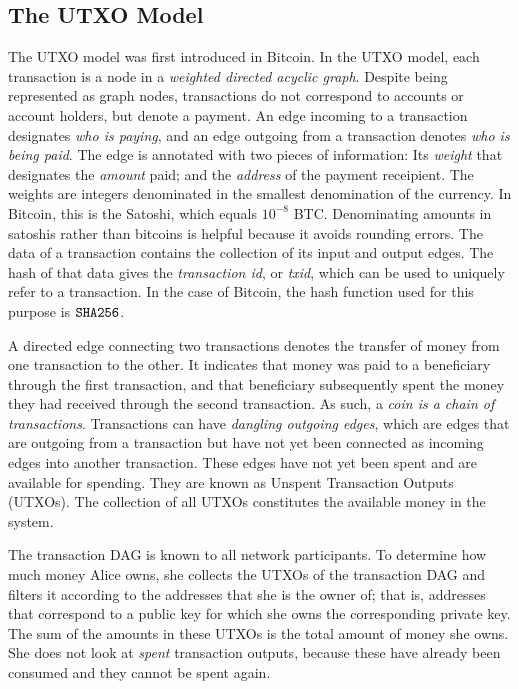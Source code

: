 \subsection{The UTXO Model}

The UTXO model was first introduced in Bitcoin. In the UTXO model, each
transaction is a node in a \emph{weighted directed acyclic graph}. Despite being
represented as graph nodes, transactions do not correspond to accounts or
account holders, but denote a payment. An edge incoming to a transaction
designates \emph{who is paying}, and an edge outgoing from a transaction denotes
\emph{who is being paid}. The edge is annotated with two pieces of information:
Its \emph{weight} that designates the \emph{amount} paid; and the \emph{address}
of the payment receipient. The weights are integers denominated in the smallest
denomination of the currency. In Bitcoin, this is the Satoshi,
which equals $10^{-8}$ BTC. Denominating amounts in satoshis rather than
bitcoins is helpful because it avoids rounding errors. The data of a transaction
contains the collection of its input and output edges. The hash of that data
gives the \emph{transaction id}, or \emph{txid}, which can be used
to uniquely refer to a transaction. In the case of Bitcoin, the hash function
used for this purpose is $\mathtt{SHA256}$.

A directed edge connecting two transactions denotes the transfer of money
from one transaction to the other. It indicates that money was paid to a
beneficiary through the first transaction, and that beneficiary subsequently
spent the money they had received through the second transaction. As such,
a \emph{coin is a chain of transactions}. Transactions can have \emph{dangling
outgoing edges}, which are edges that are outgoing from a transaction but have
not yet been connected as incoming edges into another transaction. These edges
have not yet been spent and are available for spending. They are known as
Unspent Transaction Outputs (UTXOs). The collection of all UTXOs
constitutes the available money in the system.

The transaction DAG is known to all network participants. To determine how much
money Alice owns, she collects the UTXOs of the transaction DAG and filters it
according to the addresses that she is the owner of; that is, addresses that
correspond to a public key for which she owns the corresponding private key. The
sum of the amounts in these UTXOs is the total amount of money she owns. She
does not look at \emph{spent} transaction outputs, because these have already
been consumed and they cannot be spent again.

